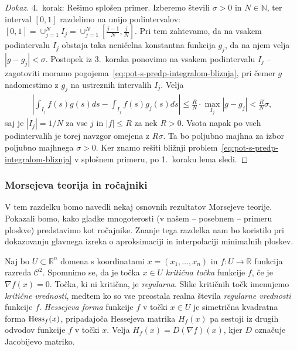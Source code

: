 \documentclass[12pt,a4paper,twoside]{article}
\theoremstyle{definition} %
\newenvironment{dokaz}[1][Dokaz]{\begin{proof}[#1]}{\end{proof}}
\theoremstyle{plain} %
\numberwithin{equation}{section}  %
\begin{document}
\begin{dokaz}
4.~korak: Rešimo splošen primer. \newline
Izberemo števili $\sigma > 0$ in $N \in \mathbb{N}$, ter interval $[0,1]$ razdelimo na unijo podintervalov: $[0,1] = \cup_{j=1}^{N} I_{j} = \cup_{j=1}^{N} [\frac{j-1}{N}, \frac{j}{N}]$. Pri tem zahtevamo, da na vsakem podintervalu $I_{j}$ obstaja taka neničelna konstantna funkcija $g_{j}$, da na njem velja $|g - g_{j}| < \sigma$.
Postopek iz 3.~koraka ponovimo na vsakem podintervalu $I_{j}$ -- zagotoviti moramo pogojema~\eqref{eq:pot-s-predp-integralom-bliznja}, pri čemer $g$ nadomestimo z $g_{j}$ na ustreznih intervalih $I_{j}$.
Velja
\begin{gather*}
\left| \int_{I_{j}} f(s)g(s)ds - \int_{I_{j}} f(s)g_{j}(s)ds \right| \leq \frac{R}{N} \cdot \max_{I_{j}} |g - g_{j}| < \frac{R}{N} \sigma,
\end{gather*}
saj je $|I_{j}| = 1/N$ za vse $j$ in $|f| \leq R$ za nek $R > 0$.
Vsota napak po vseh podintervalih je torej navzgor omejena z $R \sigma$. Ta bo poljubno majhna za izbor poljubno majhnega $\sigma >0$.
Ker znamo rešiti bližnji problem~\eqref{eq:pot-s-predp-integralom-bliznja} v splošnem primeru, po 1.~koraku lema sledi.
\end{dokaz}

\subsubsection{Morsejeva teorija in ročajniki}
%
V tem razdelku bomo navedli nekaj osnovnih rezultatov Morsejeve teorije. Pokazali bomo, kako gladke mnogoterosti (v našem -- posebnem -- primeru ploskve) predstavimo kot ročajnike. Znanje tega razdelka nam bo koristilo pri dokazovanju glavnega izreka o aproksimaciji in interpolaciji minimalnih ploskev.
   
Naj bo $U \subset \mathbb{R}^{n}$ domena s koordinatami $x = (x_{1}, \dots , x_{n})$ in $f \colon U \to \mathbb{R}$ funkcija razreda $\mathcal{C}^{2}$.
Spomnimo se, da je točka $x \in U$ \emph{kritična točka} funkcije $f$, če je $\nabla f(x) = 0$. Točka, ki ni kritična, je \emph{regularna}.
Slike kritičnih točk imenujemo \emph{kritične vrednosti}, medtem ko so vse preostala realna števila \emph{regularne vrednosti} funkcije $f$. \newline
%
\emph{Hessejeva forma} funkcije $f$ v točki $x \in U$ je simetrična kvadratna forma $\textup{Hess}_{f}(x)$, pripadajoča Hessejeva matrika $H_{f}(x)$ pa sestoji iz drugih odvodov funkcije $f$ v točki $x$. Velja $H_{f}(x) = D(\nabla f)(x)$, kjer $D$ označuje Jacobijevo matriko.
\end{document}
